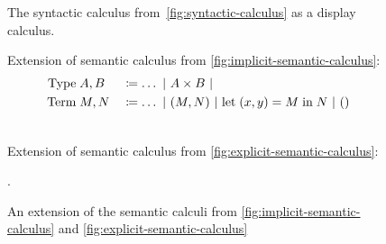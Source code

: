 \begin{figure}
\begin{mdframed}
    \vspace*{\baselineskip}
    \begin{pfbox}
      \doubleLine{}
    \end{pfbox}
    \vspace*{\baselineskip}
    \begin{pfbox}
      \doubleLine{}
    \end{pfbox}
  \end{mdframed}
  \caption{
    The syntactic calculus from~\autoref{fig:syntactic-calculus} as a
    display calculus.}%
  \label{fig:display-calculus}
\end{figure}
%
\begin{figure}
  \begin{mdframed}
    \centering
    \vspace*{\baselineskip}
    Extension of semantic calculus from
    \autoref{fig:implicit-semantic-calculus}:
    \begin{alignat*}{4}
      \text{Type}\;&A,B&&\coloneqq\ldots\vsep A\times B\vsep\\
      \text{Term}\;&M,N&&\coloneqq\ldots\vsep (M, N)\vsep\case{M}{x}{y}{N}\vsep()
    \end{alignat*}
    \begin{prooftree}
    \end{prooftree}
    \begin{prooftree}
    \end{prooftree}
    \hrulefill\\%
    \vspace*{\baselineskip}
    Extension of semantic calculus from
    \autoref{fig:explicit-semantic-calculus}:
    \begin{prooftree}
    \end{prooftree}
    \begin{prooftree}
    \end{prooftree}
    \vspace*{0.5\baselineskip}
  \end{mdframed}
  \caption{An extension of the semantic calculi from
    \autoref{fig:implicit-semantic-calculus} and
    \autoref{fig:explicit-semantic-calculus}}.
  \label{fig:extended-semantic-calculi}
\end{figure}
%
